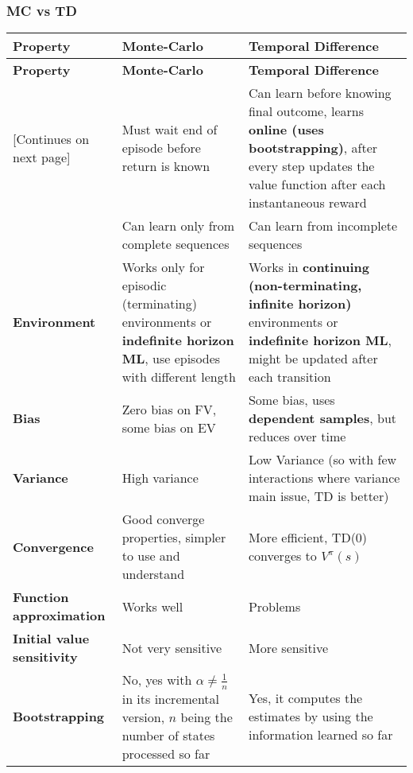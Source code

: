 \subsubsection{MC vs TD}
    \begin{tabularx}{\linewidth}{X|X|X}
        \toprule
        \textbf{Property} & \textbf{Monte-Carlo} & \textbf{Temporal Difference}\\
        \midrule
        \endfirsthead
        \toprule
        \textbf{Property} & \textbf{Monte-Carlo} & \textbf{Temporal Difference}\\
        \midrule
        \endhead
        \footnotesize [Continues on next page]
        \endfoot
        \bottomrule
        \endlastfoot
        \multirow{2}{*}{\textbf{Learning}} & Must wait end of episode before return is known & Can learn before knowing final outcome, learns \textbf{online (uses bootstrapping)}, after every step updates the value function after each instantaneous reward\\ \cmidrule{2-3}
        & Can learn only from complete sequences & Can learn from incomplete sequences\\ \midrule
        \textbf{Environment} & Works only for episodic (terminating) environments or \textbf{indefinite horizon ML}, use episodes with different length & Works in \textbf{continuing (non-terminating, infinite horizon)} environments or \textbf{indefinite horizon ML}, might be updated after each transition \\ \midrule
        \textbf{Bias} & Zero bias on FV, some bias on EV& Some bias, uses \textbf{dependent samples}, but reduces over time \\ \midrule
        \textbf{Variance} & High variance & Low Variance (so with few interactions where variance main issue, TD is better)\\ \midrule
        \textbf{Convergence} & Good converge properties, simpler to use and understand & More efficient, TD(0) converges to $V^\pi(s)$ \\ \midrule
        \textbf{Function approximation} & Works well & Problems \\ \midrule
        \textbf{Initial value sensitivity} & Not very sensitive & More sensitive \\ \midrule
        \textbf{Bootstrapping} & No, yes with $\alpha\neq\frac{1}{n}$ in its incremental version, $n$ being the number of states processed so far & Yes, it computes the estimates by using the information learned so far\\ \midrule

\end{tabularx}
